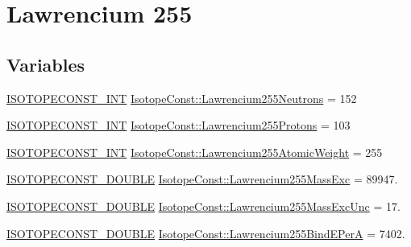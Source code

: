 \hypertarget{group___isotope_const-_lawrencium-_lr255}{}\section{Lawrencium 255}
\label{group___isotope_const-_lawrencium-_lr255}
\subsection*{Variables}
\begin{DoxyCompactItemize}
\item 
\mbox{\hyperlink{group___isotope_const-_macros_ga5f18360b3e99483a35c32d789e62621c}{I\+S\+O\+T\+O\+P\+E\+C\+O\+N\+S\+T\+\_\+\+I\+NT}} \mbox{\hyperlink{group___isotope_const-_lawrencium-_lr255_gaf7938f48eddb724cdd6cfe7ae8d8074b}{Isotope\+Const\+::\+Lawrencium255\+Neutrons}} = 152
\item 
\mbox{\hyperlink{group___isotope_const-_macros_ga5f18360b3e99483a35c32d789e62621c}{I\+S\+O\+T\+O\+P\+E\+C\+O\+N\+S\+T\+\_\+\+I\+NT}} \mbox{\hyperlink{group___isotope_const-_lawrencium-_lr255_gae74e0dc4f7f2dc44c17a97e353473c77}{Isotope\+Const\+::\+Lawrencium255\+Protons}} = 103
\item 
\mbox{\hyperlink{group___isotope_const-_macros_ga5f18360b3e99483a35c32d789e62621c}{I\+S\+O\+T\+O\+P\+E\+C\+O\+N\+S\+T\+\_\+\+I\+NT}} \mbox{\hyperlink{group___isotope_const-_lawrencium-_lr255_ga0ebbef385eeb6212a412a08385a91634}{Isotope\+Const\+::\+Lawrencium255\+Atomic\+Weight}} = 255
\item 
\mbox{\hyperlink{group___isotope_const-_macros_ga8f45a7272ce02c0b4c65c44636ed719a}{I\+S\+O\+T\+O\+P\+E\+C\+O\+N\+S\+T\+\_\+\+D\+O\+U\+B\+LE}} \mbox{\hyperlink{group___isotope_const-_lawrencium-_lr255_ga5879f94861c51098d2dcc904a63f7c7a}{Isotope\+Const\+::\+Lawrencium255\+Mass\+Exc}} = 89947.
\item 
\mbox{\hyperlink{group___isotope_const-_macros_ga8f45a7272ce02c0b4c65c44636ed719a}{I\+S\+O\+T\+O\+P\+E\+C\+O\+N\+S\+T\+\_\+\+D\+O\+U\+B\+LE}} \mbox{\hyperlink{group___isotope_const-_lawrencium-_lr255_ga75e21e6a67820874ab056411ebce2f58}{Isotope\+Const\+::\+Lawrencium255\+Mass\+Exc\+Unc}} = 17.
\item 
\mbox{\hyperlink{group___isotope_const-_macros_ga8f45a7272ce02c0b4c65c44636ed719a}{I\+S\+O\+T\+O\+P\+E\+C\+O\+N\+S\+T\+\_\+\+D\+O\+U\+B\+LE}} \mbox{\hyperlink{group___isotope_const-_lawrencium-_lr255_ga0e0eb6a388c6792b31e71b3dc09f0ce0}{Isotope\+Const\+::\+Lawrencium255\+Bind\+E\+PerA}} = 7402.
\item 

\end{DoxyCompactItemize}
